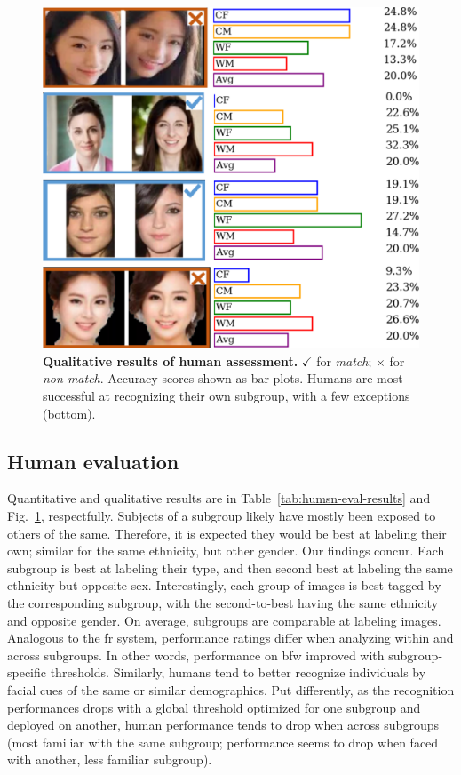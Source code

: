 \begin{figure}[t!] 
	\centering    
	\includegraphics[width=\linewidth] {figures/human_eval.pdf}
		\caption{\small{\textbf{Qualitative results of human assessment.} $\checkmark$ for \emph{match}; $\times$ for \emph{non-match}. Accuracy scores shown as bar plots. Humans are most successful at recognizing their own subgroup, with a few exceptions (\eg bottom).}}
		\label{fig:human-eval} 
\end{figure} 
\subsection{Human evaluation}
 Quantitative and qualitative results are in Table~\ref{tab:humsn-eval-results} and Fig.~\ref{fig:human-eval}, respectfully. Subjects of a subgroup likely have mostly been exposed to others of the same. Therefore, it is expected they would be best at labeling their own; similar for the same ethnicity, but other gender. Our findings concur. Each subgroup is best at labeling their type, and then second best at labeling the same ethnicity but opposite sex. Interestingly, each group of images is best tagged by the corresponding subgroup, with the second-to-best having the same ethnicity and opposite gender. On average, subgroups are comparable at labeling images. Analogous to the \gls{fr} system, performance ratings differ when analyzing within and across subgroups. In other words, performance on \gls{bfw} improved with subgroup-specific thresholds. Similarly, humans tend to better recognize individuals by facial cues of the same or similar demographics. Put differently, as the recognition performances drops with a global threshold optimized for one subgroup and deployed on another, human performance tends to drop when across subgroups (\ie most familiar with the same subgroup; performance seems to drop when faced with another, less familiar subgroup).
 
